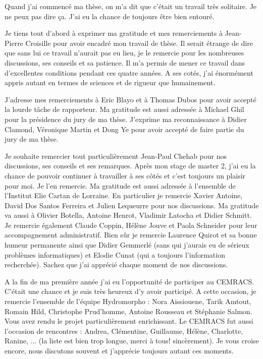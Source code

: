 \noindent \hrulefill
\vspace{.6cm}


Quand j'ai commencé ma thèse, on m'a dit que c'était un travail très solitaire. Je ne peux pas dire ça. J'ai eu la chance de toujours être bien entouré.

\vspace{.6cm}

Je tiens tout d'abord à exprimer ma gratitude et mes remerciements à Jean-Pierre Croisille pour avoir encadré mon travail de thèse. Il serait étrange de dire que sans lui ce travail n'aurait pas eu lieu, je le remercie pour les nombreuses discussions, ses conseils et sa patience. Il m'a permis de mener ce travail dans d'excellentes conditions pendant ces quatre années. A ses cotés, j'ai énormément appris autant en termes de sciences et de rigueur que humainement.
\vspace{.6cm}

J'adresse mes remerciements à Eric Blayo et à Thomas Dubos pour avoir accepté la lourde tâche de rapporteur. Ma gratitude est aussi adressée à Michael Ghil pour la présidence du jury de ma thèse. J'exprime ma reconnaissance à Didier Clamond, Véronique Martin et Dong Ye pour avoir accepté de faire partie du jury de ma thèse.
\vspace{.6cm}

Je souhaite remercier tout particulièrement Jean-Paul Chehab pour nos discussions, ses conseils et ses remarques. Après mon stage de master 2, j'ai eu la chance de pouvoir continuer à travailler à ses côtés et c'est toujours un plaisir pour moi. Je l'en remercie. Ma gratitude est aussi adressée à l'ensemble de l'Institut Elie Cartan de Lorraine. En particulier je remercie Xavier Antoine, David Dos Santos Ferreira et Julien Lequeurre pour nos discussions. Ma gratitude va aussi à Olivier Botella, Antoine Henrot, Vladimir Latocha et Didier Schmitt.
Je remercie également Claude Coppin, Hélène Jouve et Paola Schneider pour leur accompagnement administratif. Bien sûr je remercie Laurence Quirot et sa bonne humeur permanente ainsi que Didier Gemmerlé (sans qui j'aurais eu de sérieux problèmes informatiques) et Elodie Cunat (qui a toujours l'information recherchée). Sachez que j'ai apprécié chaque moment de nos discussions.
\vspace{.6cm}

A la fin de ma première année j'ai eu l'opportunité de participer au CEMRACS. C'était une chance et je suis très heureux d'y avoir participé. A cette occasion, je remercie l'ensemble de l'équipe Hydromorpho : Nora Aissiouene, Tarik Amtout, Romain Hild, Christophe Prud'homme, Antoine Rousseau et Stéphanie Salmon. Vous avez rendu le projet particulièrement enrichissant. Le CEMRACS fut aussi l'occasion de rencontres : Andrea, Clémentine, Guillaume, Hélène, Charlotte, Ranine, ... (la liste est bien trop longue, merci à tous! sincèrement). Je vous croise encore, nous discutons souvent et j'apprécie toujours autant ces moments.
\vspace{.6cm}

